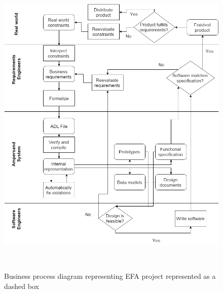 

\begin{figure}[!htb]
\begin{center}
\includegraphics[width=\textwidth]{../figures/business_process}
\caption{Business process diagram representing EFA project represented as a dashed box}~\label{fig:EFAproject}
\end{center}
\end{figure}


